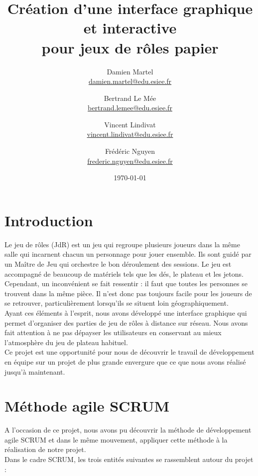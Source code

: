 \documentclass[11pt]{article}
\title{Création d'une interface graphique et interactive \\ pour jeux de rôles papier}
\author{
	Damien Martel \\ \href{mailto:damien.martel@edue.esiee.fr}{damien.martel@edu.esiee.fr} \and
	Bertrand Le Mée \\ \href{mailto:bertrand.lemee@edu.esiee.fr}{bertrand.lemee@edu.esiee.fr} \and
	Vincent Lindivat \\ \href{mailto:vincent.lindivat@edu.esiee.fr}{vincent.lindivat@edu.esiee.fr} \and
	Frédéric Nguyen \\ \href{mailto:frederic.nguyen@edu.esiee.fr}{frederic.nguyen@edu.esiee.fr}
}
\date{\today}
\begin{document}
\maketitle
\newpage
\hfill
\newpage
\tableofcontents
\newpage

\section{Introduction}

Le jeu de rôles (JdR) est un jeu qui regroupe plusieurs joueurs dans la même salle qui incarnent chacun un personnage pour jouer ensemble. Ils sont guidé par un Maître de Jeu qui orchestre le bon déroulement des sessions. Le jeu est accompagné de beaucoup de matériels tels que les dés, le plateau et les jetons. Cependant, un inconvénient se fait ressentir : il faut que toutes les personnes se trouvent dans la même pièce. Il n'est donc pas toujours facile pour les joueurs de se retrouver, particulièrement lorsqu'ils se situent loin géographiquement. \\

Ayant ces éléments à l'esprit, nous avons développé une interface graphique qui permet d'organiser des parties de jeu de rôles à distance sur réseau. Nous avons fait attention à ne pas dépayser les utilisateurs en conservant au mieux l'atmosphère du jeu de plateau habituel. \\

Ce projet est une opportunité pour nous de découvrir le travail de développement en équipe sur un projet de plus grande envergure que ce que nous avons réalisé jusqu'à maintenant.	

\section{Méthode agile SCRUM}

A l'occasion de ce projet, nous avons pu découvrir la méthode de développement
 agile SCRUM  et dans le même mouvement, appliquer cette méthode à la réalisation de notre projet.\\
 
Dans le cadre SCRUM, les trois entités suivantes se rassemblent autour du projet :
\end{document}

